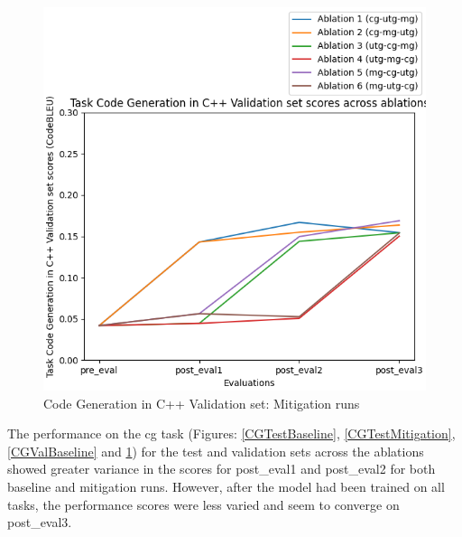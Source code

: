 \begin{figure}[H]
\begin{minipage}{0.45\textwidth}
        \includegraphics[width=1.1\textwidth]{Figures/results/code_mitigation_graphs/task_eval/seed_averaged_task_cg_val_eval_mitigation.png} %
        \captionsetup{width=1.1\textwidth}
        \caption{Code Generation in C++ Validation set: Mitigation runs}
        \label{CGValMitigation}
    \end{minipage}
\end{figure}
The performance on the cg task (Figures: \ref{CGTestBaseline}, \ref{CGTestMitigation}, \ref{CGValBaseline} and \ref{CGValMitigation}) for the test and validation sets across the ablations showed greater variance in the scores for post\_eval1 and post\_eval2 for both baseline and mitigation runs. However, after the model had been trained on all tasks, the performance scores were less varied and seem to converge on post\_eval3. 

